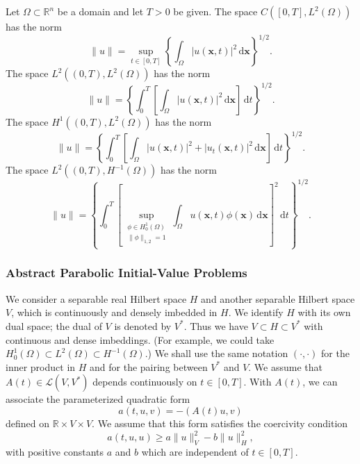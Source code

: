 \begin{Example}
\label{ex:time-spatial-function-spaces-norms}
Let $\Omega\subset\mathbb{R}^n$ be a domain and let $T>0$ be given. The space $C([0,T],L^2(\Omega))$ has the norm
\begin{equation}\label{eq:time-continuous-ltwo-spatial-function-norm}
\|u\|=\sup_{t\in[0,T]}\left\{\int_\Omega|u(\bm{x},t)|^2\,\mathrm{d}\bm{x}\right\}^{1/2}.
\end{equation}
The space $L^2((0,T),L^2(\Omega))$ has the norm
\begin{equation}\label{eq:time-ltwo-ltwo-spatial-function-norm}
\|u\|=\left\{\int_0^T\left[\int_\Omega|u(\bm{x},t)|^2\,\mathrm{d}\bm{x}\right]\,\mathrm{d}t\right\}^{1/2}.
\end{equation}
The space $H^1((0,T),L^2(\Omega))$ has the norm
\begin{equation}\label{eq:time-hone-ltwo-spatial-function-norm}
\|u\|=\left\{\int_0^T\left[\int_\Omega|u(\bm{x},t)|^2+|u_t(\bm{x},t)|^2\,\mathrm{d}\bm{x}\right]\,\mathrm{d}t\right\}^{1/2}.
\end{equation}
The space $L^2((0,T),H^{-1}(\Omega))$ has the norm
\begin{equation}\label{eq:time-ltwo-negative-spatial-sobolev-norm}
\|u\|=\left\{\int_0^T\left[\sup_{\substack{\phi\in H_0^1(\Omega)\\\|\phi\|_{1,2}=1}}\int_\Omega u(\bm{x},t)\phi(\bm{x})\,\mathrm{d}\bm{x}\right]^2\,\mathrm{d}t\right\}^{1/2}.
\end{equation}

\end{Example}

\subsubsection{Abstract Parabolic Initial-Value Problems}\label{subsec:abstract-parabolic-initial-value-problems}

We consider a separable real Hilbert space $H$ and another separable Hilbert space $V$, which is continuously and densely imbedded in $H$. We identify $H$ with its own dual space; the dual of $V$ is denoted by $V^*$. Thus we have $V\subset H\subset V^*$ with continuous and dense imbeddings. (For example, we could take $H_0^1(\Omega)\subset L^2(\Omega)\subset H^{-1}(\Omega)$.) We shall use the same notation $(\cdot,\cdot)$ for the inner product in $H$ and for the pairing between $V^*$ and $V$. We assume that $A(t)\in\mathcal{L}(V,V^*)$ depends continuously on $t\in[0,T]$. With $A(t)$, we can associate the parameterized quadratic form
\begin{equation}\label{eq:abstract-parabolic-parameterized-quadratic-form}
a(t,u,v)=-(A(t)u,v)
\end{equation}
defined on $\mathbb{R}\times V\times V$. We assume that this form satisfies the coercivity condition
\begin{equation}\label{eq:abstract-parabolic-form-coercivity}
a(t,u,u)\geq a\|u\|_V^2-b\|u\|_H^2,
\end{equation}
with positive constants $a$ and $b$ which are independent of $t\in[0,T]$.

